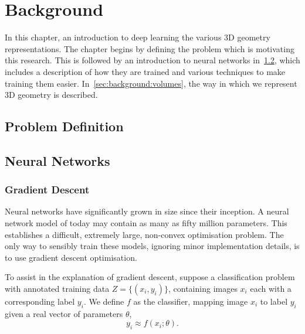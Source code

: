 \chapter{Background}

In this chapter, an introduction to deep learning the various 3D
geometry representations. The chapter begins by defining the problem
which is motivating this research. This is followed by an introduction
to neural networks in~\ref{sec:background:nn}, which includes a
description of how they are trained and various techniques to make
training them easier. In~\ref{sec:background:volumes}, the way in
which we represent 3D geometry is described.

\section{Problem Definition}
\label{sec:background:problem}




\section{Neural Networks}
\label{sec:background:nn}

\subsection{Gradient Descent}

Neural networks have significantly grown in size since their
inception. A neural network model of today may contain as many as
fifty million parameters. This establishes a difficult, extremely
large, non-convex optimisation problem. The only way to sensibly train
these models, ignoring minor implementation details, is to use
gradient descent optimisation.


To assist in the explanation of gradient descent, suppose a
classification problem with annotated training data
$Z = \{(x_i, y_i)\}$, containing images $x_i$ each with a
corresponding label $y_i$. We define $f$ as the classifier, mapping
image $x_i$ to label $y_i$ given a real vector of parameters $\theta$,
\begin{equation}
  y_i \approx f(x_i;\theta) .
\end{equation}

